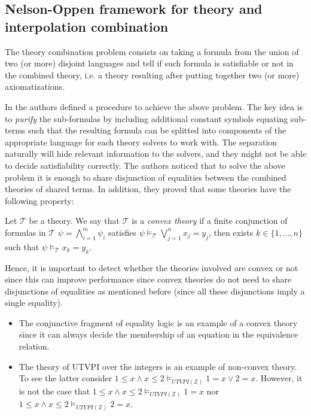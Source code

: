 \subsection{Nelson-Oppen framework for theory and interpolation
combination}

The theory combination problem consists on taking a 
formula from the union of two (or more) disjoint 
languages and tell if such formula is satisfiable
or not in the combined theory, i.e. a theory resulting
after putting together two (or more) axiomatizations.

In \cite{10.1145/357073.357079} the authors defined a procedure
to achieve the above problem. The key idea is to \emph{purify} 
the sub-formulas by including additional constant 
symbols equating sub-terms such that the resulting formula 
can be splitted into components of the appropriate language 
for each theory solvers to work with. The separation naturally
will hide relevant information to the solvers, and they 
might not be able to decide satisfiability correctly.
The authors noticed that to solve the above problem it is enough to 
share disjunction of equalities between the combined theories of shared
terms. In addition, they proved that some theories have the 
following property:

\begin{definition}
  Let $\mathcal{T}$ be a theory. We say that $\mathcal{T}$
  is a \emph{convex theory} if a finite conjunction of formulas 
  in $\mathcal{T}$ $\psi = \bigwedge_{i = 1}^m \psi_i$ satisfies
  $\psi \models_{\mathcal{T}} \bigvee_{j = 1}^n 
  x_j = y_j$, then exists $k \in \{1, \dots, n \}$ such that 
  $\psi \models_{\mathcal{T}} x_k = y_k$.
\end{definition}

Hence, it is important to detect
whether the theories involved are convex or not since 
this can improve performance since convex theories do not
need to share disjunctions of equalities as mentioned before
(since all these disjunctions imply a single equality).

\begin{example}
  \begin{itemize}
    \item The conjunctive fragment of equality logic is an example
      of a convex theory since
      it can always decide the membership of an equation in the 
      equivalence relation. 
    \item The theory of UTVPI over the integers is an example of 
      non-convex theory. To see the latter consider
      $1 \leq x \land x \leq 2 \models_{UTVPI(\mathbb{Z})} 1 = x \lor 2 = x$.
      However, it is not the case that 
      $1 \leq x \land x \leq 2 \models_{UTVPI(\mathbb{Z})} 1 = x$
      nor 
      $1 \leq x \land x \leq 2 \models_{UTVPI(\mathbb{Z})} 2 = x$.
  \end{itemize}
\end{example}

